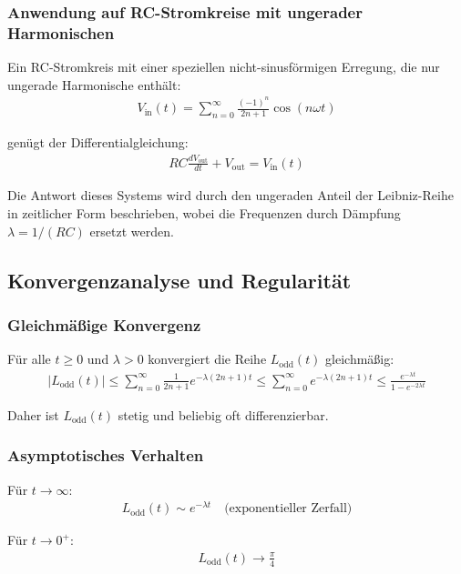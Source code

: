 \documentclass[a4paper,12pt,twoside]{report}
\theoremstyle{definition}
\begin{document}
\subsubsection*{Anwendung auf RC-Stromkreise mit ungerader Harmonischen}

Ein RC-Stromkreis mit einer speziellen nicht-sinusförmigen Erregung, die nur ungerade Harmonische enthält:
\begin{align}
	V_{\text{in}}(t) = \sum_{n=0}^{\infty} \frac{(-1)^n}{2n+1} \cos(n\omega t)
\end{align}

genügt der Differentialgleichung:
\begin{align}
	RC \frac{dV_{\text{out}}}{dt} + V_{\text{out}} = V_{\text{in}}(t)
\end{align}

Die Antwort dieses Systems wird durch den ungeraden Anteil der Leibniz-Reihe in zeitlicher Form beschrieben, wobei die Frequenzen durch Dämpfung $\lambda = 1/(RC)$ ersetzt werden.

\subsection{Konvergenzanalyse und Regularität}

\subsubsection*{Gleichmäßige Konvergenz}

Für alle $t \geq 0$ und $\lambda > 0$ konvergiert die Reihe $L_{\text{odd}}(t)$ gleichmäßig:
\begin{align}
	|L_{\text{odd}}(t)| \leq \sum_{n=0}^{\infty} \frac{1}{2n+1} e^{-\lambda(2n+1)t} \leq \sum_{n=0}^{\infty} e^{-\lambda(2n+1)t} \leq \frac{e^{-\lambda t}}{1 - e^{-2\lambda t}}
\end{align}

Daher ist $L_{\text{odd}}(t)$ stetig und beliebig oft differenzierbar.

\subsubsection*{Asymptotisches Verhalten}

Für $t \to \infty$:
\begin{align}
	L_{\text{odd}}(t) \sim e^{-\lambda t} \quad \text{(exponentieller Zerfall)}
\end{align}

Für $t \to 0^+$:
\begin{align}
	L_{\text{odd}}(t) \to \frac{\pi}{4}
\end{align}
\end{document}
